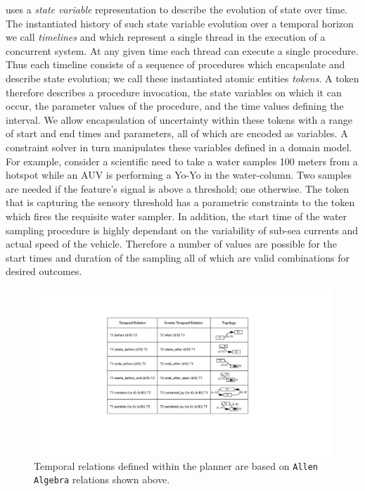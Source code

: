 \eu uses a \emph{state variable} representation to describe the
evolution of state over time. The instantiated history of such state
variable evolution over a temporal horizon we call \emph{timelines}
and which represent a single thread in the execution of a concurrent
system. At any given time each thread can execute a single procedure.
Thus each timeline consists of a sequence of procedures which
encapsulate and describe state evolution; we call these instantiated
atomic entities \emph{tokens}.  A token therefore describes a
procedure invocation, the state variables on which it can occur, the
parameter values of the procedure, and the time values defining the
interval. We allow encapsulation of uncertainty within these tokens
with a range of start and end times and parameters, all of which are
encoded as variables. A constraint solver in turn manipulates these
variables defined in a \eu domain model. For example, consider
a scientific need to take a water samples 100 meters from a hotspot
while an AUV is performing a Yo-Yo in the water-column. Two samples
are needed if the feature's signal is above a threshold; one
otherwise. The token that is capturing the sensory threshold has a
parametric constraints to the token which fires the requisite water
sampler. In addition, the start time of the water sampling procedure
is highly dependant on the variability of sub-sea currents and actual
speed of the vehicle. Therefore a number of values are possible for
the start times and duration of the sampling all of which are valid
combinations for desired outcomes.


\begin{figure}
\centering
\includegraphics[scale=0.3]{figs/Allen-algebra.pdf}
\caption{\small Temporal relations defined within the planner are
  based on \texttt{Allen Algebra} relations shown above.}
\label{fig:allen-algebra}
\vskip-0.3cm
\end{figure}

